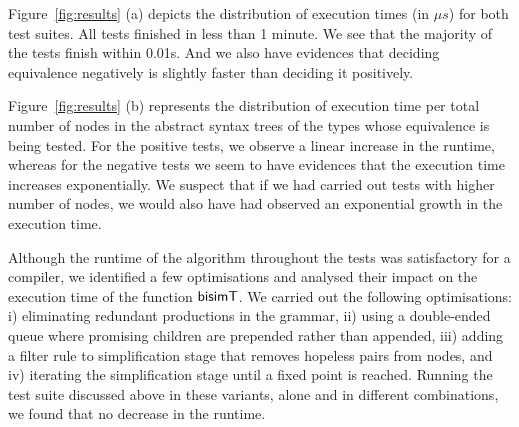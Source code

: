 
Figure~\ref{fig:results} (a) depicts the distribution of execution times 
(in $\mu s$) for both test suites. All tests finished in less
than 1 minute. We see that the majority of the tests finish within 0.01s.
And we also have evidences that deciding equivalence negatively is
slightly faster than deciding it positively.



Figure~\ref{fig:results} (b) represents the distribution of execution
time per total number of nodes in the abstract syntax trees of the types
whose equivalence is being tested. For the positive tests, we observe a
linear increase in the runtime, whereas for the negative tests
we seem to have evidences that the execution time increases exponentially.
We suspect that if we had carried out tests with higher number of nodes,
we would also have had observed an exponential growth in 
the execution time.


Although the runtime of the algorithm throughout the tests was
satisfactory for a compiler, we identified a few optimisations 
and analysed their impact on the execution time of the
function $\mathsf{bisimT}$. We carried out the following optimisations:
i) eliminating redundant productions in the grammar,
ii) using a double-ended queue where promising children are prepended
  rather than appended,
iii) adding a filter rule to simplification stage that removes hopeless
  pairs from nodes, and
iv) iterating the simplification stage until a fixed point is reached.
%
Running the test suite discussed above in these variants, alone and
in different combinations, we found that no decrease in the runtime.

